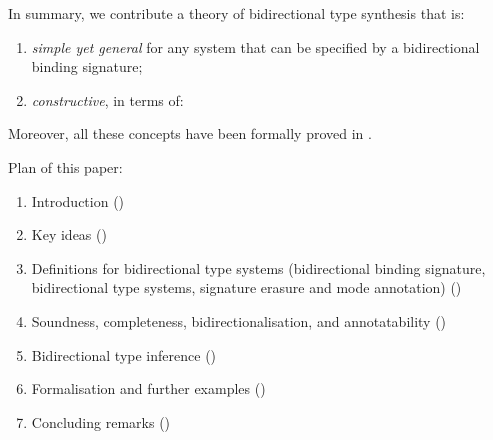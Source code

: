 In summary, we contribute a theory of bidirectional type synthesis that is:
\begin{enumerate}
  \item \emph{simple yet general} for any system that can be specified by a bidirectional binding signature;
  \item \emph{constructive}, in terms of: 
\end{enumerate}
Moreover, all these concepts have been formally proved in \Agda.

Plan of this paper:
\begin{enumerate}
  \item Introduction () 
  \item Key ideas ()
  \item Definitions for bidirectional type systems (bidirectional binding signature, bidirectional type systems, signature erasure and mode annotation) ()
  \item Soundness, completeness, bidirectionalisation, and annotatability ()
  \item Bidirectional type inference ()
  \item Formalisation and further examples ()
  \item Concluding remarks ()
     
\end{enumerate}




